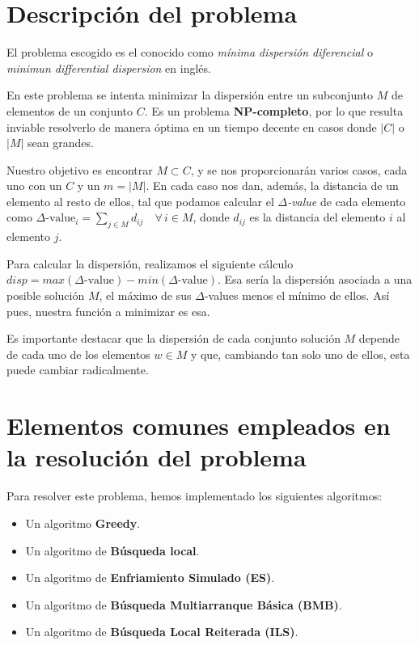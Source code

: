 \newpage %

\tableofcontents %

\newpage

\section{Descripción del problema}

El problema escogido es el conocido como \textit{mínima dispersión diferencial} o \textit{minimun differential dispersion} en inglés.

En este problema se intenta minimizar la dispersión entre un subconjunto $M$ de elementos de un conjunto $C$. Es un problema \textbf{NP-completo}, por lo que resulta inviable resolverlo de manera óptima en un tiempo decente en casos donde $|C|$ o $|M|$ sean grandes.

Nuestro objetivo es encontrar $M \subset C$, y se nos proporcionarán varios casos, cada uno con un $C$ y un $m =|M|$.
En cada caso nos dan, además, la distancia de un elemento al resto de ellos, tal que podamos calcular el \textit{$\Delta$-value} de cada elemento como $\displaystyle \Delta \text{-value}_i = \sum_{j \in M}d_{ij}\quad \forall \, i \in M$, donde $d_{ij}$ es la distancia del elemento $i$ al elemento $j$.

Para calcular la dispersión, realizamos el siguiente cálculo $disp = max(\Delta\text{-value})-min(\Delta\text{-value})$. Esa sería la dispersión asociada a una posible solución $M$, el máximo de sus $\Delta$-values menos el mínimo de ellos. Así pues, nuestra función a minimizar es esa.

Es importante destacar que la dispersión de cada conjunto solución $M$ depende de cada uno de los elementos $w \in M$ y que, cambiando tan solo uno de ellos, esta puede cambiar radicalmente.

\section{Elementos comunes empleados en la resolución del problema}
Para resolver este problema, hemos implementado los siguientes algoritmos:
\begin{itemize}
\item Un algoritmo \textbf{Greedy}.
\item Un algoritmo de \textbf{Búsqueda local}.
\item Un algoritmo de \textbf{Enfriamiento Simulado (ES)}.
\item Un algoritmo de \textbf{Búsqueda Multiarranque Básica (BMB)}.
\item Un algoritmo de \textbf{Búsqueda Local Reiterada (ILS)}.
\end{itemize}

